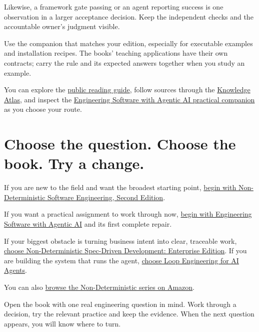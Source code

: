 \documentclass[11pt]{article}
\begin{document}
Likewise, a framework gate passing or an agent reporting success is one observation in a larger acceptance decision. Keep the independent checks and the accountable owner's judgment visible.

Use the companion that matches your edition, especially for executable examples and installation recipes. The books' teaching applications have their own contracts; carry the rule and its expected answers together when you study an example.

You can explore the \href{https://popoloni.github.io/esa_ai/companion/series/READING_THE_SERIES.html}{public reading guide}, follow sources through the \href{https://popoloni.github.io/}{Knowledge Atlas}, and inspect the \href{https://popoloni.github.io/esa_ai/}{Engineering Software with Agentic AI practical companion} as you choose your route.

\section{Choose the question. Choose the book. Try a change.}

If you are new to the field and want the broadest starting point, \href{https://www.amazon.com/dp/B0HN9J7VZG}{begin with Non-Deterministic Software Engineering, Second Edition}.

If you want a practical assignment to work through now, \href{https://www.amazon.com/dp/B0HSPH86CG}{begin with Engineering Software with Agentic AI} and its first complete repair.

If your biggest obstacle is turning business intent into clear, traceable work, \href{https://www.amazon.com/dp/B0GZZDFMYF}{choose Non-Deterministic Spec-Driven Development: Enterprise Edition}. If you are building the system that runs the agent, \href{https://www.amazon.com/dp/1808766415}{choose Loop Engineering for AI Agents}.

You can also \href{https://www.amazon.com/dp/B0GHCXPBRM}{browse the Non-Deterministic series on Amazon}.

Open the book with one real engineering question in mind. Work through a decision, try the relevant practice and keep the evidence. When the next question appears, you will know where to turn.
\end{document}
